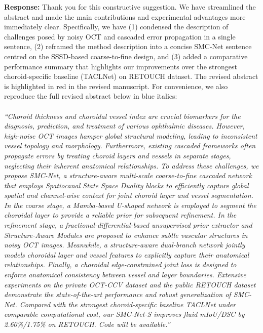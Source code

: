 \documentclass[11pt]{article}
\newcommand{\commentresponse}[2]{{\color{blue}\textbf{Response:} #2}}
\begin{document}
\begin{enumerate}
    \commentresponse{1}{
    Thank you for this constructive suggestion. 
    We have streamlined the abstract and made the main contributions and experimental advantages more immediately clear. Specifically, we have (1) condensed the description of challenges posed by noisy OCT and cascaded error propagation in a single sentence, (2) reframed the method description into a concise SMC-Net sentence centred on the SSSD-based coarse-to-fine design, and (3) added a comparative performance summary that highlights our improvements over the strongest choroid-specific baseline (TACLNet) on RETOUCH dataset. The revised abstract is highlighted in red in the revised manuscript. For convenience, we also reproduce the full revised abstract below in blue italics:\\
    \\
    \textit{{\color{blue}
    ``Choroid thickness and choroidal vessel index are crucial biomarkers for the diagnosis, prediction, and treatment of various ophthalmic diseases. 
    However, high-noise OCT images hamper global structural modeling, leading to inconsistent vessel topology and morphology. Furthermore, existing cascaded frameworks often propagate errors by treating choroid layers and vessels in separate stages, neglecting their inherent anatomical relationships.
    To address these challenges, we propose SMC-Net, a structure-aware multi-scale coarse-to-fine cascaded network that employs Spatiocanal State Space Duality blocks to efficiently capture global spatial and channel-wise context for joint choroid layer and vessel segmentation.
    In the coarse stage, a Mamba-based U-shaped network is employed to segment the choroidal layer to provide a reliable prior for subsequent refinement.
    In the refinement stage, a fractional-differential-based unsupervised prior extractor and Structure-Aware Modules are proposed to enhance subtle vascular structures in noisy OCT images.
    Meanwhile, a structure-aware dual-branch network jointly models choroidal layer and vessel features to explicitly capture their anatomical relationships.
    Finally, a choroidal edge-constrained joint loss is designed to enforce anatomical consistency between vessel and layer boundaries.
    Extensive experiments on the private OCT-CCV dataset and the public RETOUCH dataset demonstrate the state-of-the-art performance and robust generalization of SMC-Net. Compared with the strongest choroid-specific baseline TACLNet under comparable computational cost, our SMC-Net-S improves fluid mIoU/DSC by 2.60\%/1.75\% on RETOUCH. Code will be available.''}}
    }


\end{enumerate}
\end{document}
